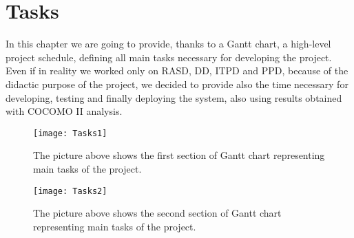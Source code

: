 \chapter{Tasks}
In this chapter we are going to provide, thanks to a Gantt chart, a high-level project schedule, defining all main tasks necessary for developing the project. Even if in reality we worked only on RASD, DD, ITPD and PPD, because of the didactic purpose of the project, we decided to provide also the time necessary for developing, testing and finally deploying the system, also using results obtained with COCOMO II analysis.

\begin{figure}[H]
	\begin{adjustwidth}{-2in}{-2in}
		\centering
		\texttt{[image: Tasks1]}
	\end{adjustwidth}
	\caption[Tasks 1]{The picture above shows the first section of Gantt chart representing main tasks of the project.}
	\label{fig:Tasks-1}
\end{figure}

\begin{figure}[H]
	\begin{adjustwidth}{-2in}{-2in}
		\centering
		\texttt{[image: Tasks2]}
	\end{adjustwidth}
	\caption[Tasks 2]{The picture above shows the second section of Gantt chart representing main tasks of the project.}
	\label{fig:Tasks-2}
\end{figure}
